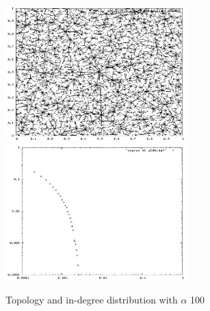\documentclass[a4paper,11pt]{article}
\begin{document}
\begin{figure}
\begin{center}
\includegraphics[width=7cm]{pic_alfa100.eps}\hfill
\includegraphics[width=7cm]{picdegree_alfa100.eps}
\end{center}
\caption{Topology and in-degree distribution
with $\alpha$ 100\label{t100figure}}
\end{figure}

%
\end{document}
